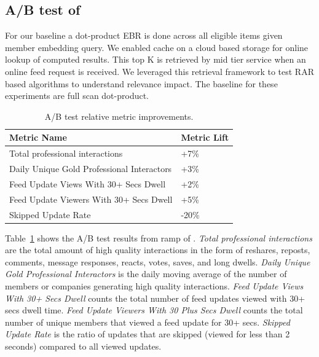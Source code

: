 \subsection{A/B test of \systemname}\label{sec:A_b_test}
For our baseline a dot-product EBR is done across all eligible items given member embedding query. We enabled cache on a cloud based storage for online lookup of computed results. This top K is retrieved by mid tier service when an online feed request is received. 
We leveraged this retrieval framework to test RAR based algorithms to understand relevance impact. The baseline for these experiments are full scan dot-product.

\begin{table}[ht]
\small
\vspace{-4pt}
\begin{tabular}{ll}
\hline
\textbf{Metric Name}
& \textbf{Metric Lift} \\\hline 
{Total professional interactions}            & +7\%   \\
{Daily Unique Gold Professional Interactors}  & +3\%   \\
{Feed Update Views With 30+ Secs Dwell}   & +2\%   \\
{Feed Update Viewers With 30+ Secs Dwell} & +5\%   \\
{Skipped Update Rate}                         & -20\% \\\hline
\end{tabular}
\caption{\small {\systemname} A/B test relative metric improvements.}
\label{table:wdotonline}
\vspace{-12pt}
\end{table}

Table~\ref{table:wdotonline} shows the A/B test results from ramp of {\systemname}. \emph{Total professional interactions} are the total amount of high quality interactions in the form of reshares, reposts, comments, message responses, reacts, votes, saves, and long dwells. \emph{Daily Unique Gold Professional Interactors} is the daily moving average of the number of members or companies generating high quality interactions. \emph{Feed Update Views With 30+ Secs Dwell} counts the total number of feed updates viewed with 30+ secs dwell time. \emph{Feed Update Viewers With 30 Plus Secs Dwell} counts the total number of unique members that viewed a feed update for 30+ secs. \emph{Skipped Update Rate} is the ratio of updates that are skipped (viewed for less than 2 seconds) compared to all viewed updates.

